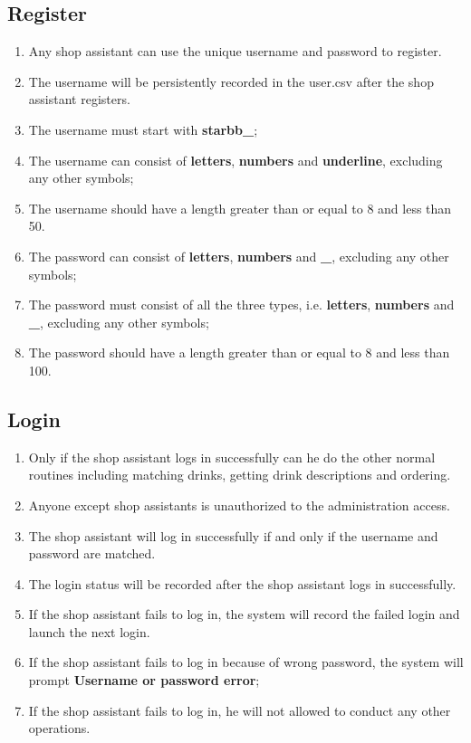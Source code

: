 \documentclass[a4paper]{report}
\begin{document}
\subsection{Register}
\begin{enumerate}
\item Any shop assistant can use the unique username and password to register.
\item The username will be persistently recorded in the user.csv after the shop assistant registers.
\item The username must start with \textbf{starbb\_};
\item The username can consist of \textbf{letters}, \textbf{numbers} and \textbf{underline}, excluding any other symbols;
\item The username should have a length greater than or equal to 8 and less than 50.
\item The password can consist of \textbf{letters}, \textbf{numbers} and \textbf{\_}, excluding any other symbols;
\item The password must consist of all the three types, i.e. \textbf{letters}, \textbf{numbers} and \textbf{\_}, excluding any other symbols;
\item The password should have a length greater than or equal to 8 and less than 100.
\end{enumerate}

\subsection{Login}
\begin{enumerate}
\item Only if the shop assistant logs in successfully can he do the other normal routines including matching drinks, getting drink descriptions and ordering.
\item Anyone except shop assistants is unauthorized to the administration access.
\item The shop assistant will log in successfully if and only if the username and password are matched.
\item The login status will be recorded after the shop assistant logs in successfully.
\item If the shop assistant fails to log in, the system will record the failed login and launch the next login.
\item If the shop assistant fails to log in because of wrong password, the system will prompt \textbf{Username or password error};
\item If the shop assistant fails to log in, he will not allowed to conduct any other operations.
\end{enumerate}
\end{document}
